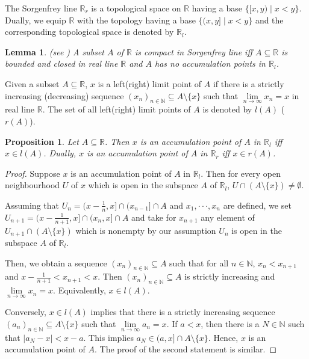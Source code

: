\documentclass[preprint,12pt]{elsarticle}
\numberwithin{equation}{section}
\newtheorem{lemma}[theorem]{Lemma}
\newtheorem{proposition}[theorem]{Proposition}
\begin{document}
\quad The Sorgenfrey line $\mathbb{R}_{r}$ is a topological space on $\mathbb{R}$ having a base $\{[x,y)\mid x<y\}$. Dually, we equip $\mathbb{R}$ with the topology having a base $\{(x,y]\mid x<y\}$ and the corresponding topological space is denoted by $\mathbb{R}_{l}$.

\begin{lemma}(see \cite{XSW87}) A subset $A$ of $\mathbb{R}$ is compact in Sorgenfrey line iff $A\subseteq\mathbb{R}$ is bounded and closed in real line $\mathbb{R}$ and $A$ has no accumulation points in $\mathbb{R}_{l}$.
\end{lemma}

\quad Given a subset $A\subseteq\mathbb{R}$, $x$ is a left(right) limit point of $A$ if there is a strictly increasing (decreasing) sequence $(x_{n})_{n\in\mathbb{N}}\subseteq A\setminus\{x\}$ such that $\lim\limits_{n\longrightarrow\infty}x_{n}=x$ in real line $\mathbb{R}$. The set of all left(right) limit points of $A$ is denoted by $l(A)$ ($r(A)$).

\begin{proposition}  Let $A\subseteq\mathbb{R}$. Then $x$ is an accumulation point of $A$ in $\mathbb{R}_{l}$ iff $x\in l(A)$. Dually, $x$ is an accumulation point of $A$ in $\mathbb{R}_{r}$ iff $x\in r(A)$.

\end{proposition}

\begin{proof}Suppose $x$ is an accumulation point of $A$ in $\mathbb{R}_{l}$. Then for every open neighbourhood $U$ of $x$ which is open in the subspace $A$ of $\mathbb{R}_{l}$, $U\cap (A\setminus\{x\})\neq\emptyset$.


Assuming that $U_{n}=(x-\frac{1}{n},x]\cap (x_{n-1}]\cap A$ and $x_{1},\cdot\cdot\cdot,x_{n}$ are defined, we set $U_{n+1}=(x-\frac{1}{n+1},x]\cap(x_{n},x]\cap A$ and take for  $x_{n+1}$ any element of $U_{n+1}\cap (A\setminus\{x\})$ which is nonempty by our assumption $U_{n}$ is open in the subspace $A$ of $\mathbb{R}_{l}$.

Then, we obtain a sequence $(x_{n})_{n\in\mathbb{N}}\subseteq A$ such that for all $n\in\mathbb{N}$, $x_{n}< x_{n+1}$ and $x-\frac{1}{n+1}<x_{n+1}<x$. Then $(x_{n})_{n\in\mathbb{N}}\subseteq A$ is strictly increasing and $\lim\limits_{n\longrightarrow\infty}x_{n}=x$. Equivalently, $x\in l(A)$.

Conversely, $x\in l(A)$ implies that there is a strictly increasing sequence $(a_{n})_{n\in\mathbb{N}}\subseteq A\setminus\{x\}$ such that $\lim\limits_{n\longrightarrow\infty}a_{n}=x$. If $a<x$, then there is a $N\in\mathbb{N}$ such that $|a_{N}-x|<x-a$. This implies $a_{N}\in(a,x]\cap A\setminus\{x\}$. Hence, $x$ is an accumulation point of $A$. The proof of the second statement is similar.\end{proof}
\end{document}
